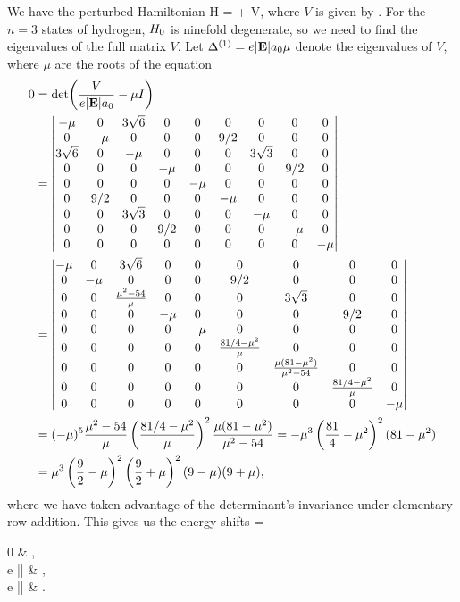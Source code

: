 \begin{solution}
	We have the perturbed Hamiltonian
	\beq
		H = \Ho + \lambda V,
	\eeq
	where $V$ is given by .  For the $n = 3$ states of hydrogen, $H_0$ is ninefold degenerate, so we need to find the eigenvalues of the full matrix $V$.  Let $\Delta^{(1)} = e |\mathbf{E}| a_0 \mu$ denote the eigenvalues of $V$, where $\mu$ are the roots of the equation
	\begin{align*}
		0 &= \det(\frac{V}{e |\vE| \ao} - \mu I) \\
		&= \vmqty{-\mu & 0 & 3 \sqrt{6} & 0 & 0 & 0 & 0 & 0 & 0 \\
			0 & -\mu & 0 & 0 & 0 & 9/2 & 0 & 0 & 0 \\
			3 \sqrt{6} & 0 & -\mu & 0 & 0 & 0 & 3 \sqrt{3} & 0 & 0 \\
			0 & 0 & 0 & -\mu & 0 & 0 & 0 & 9/2 & 0 \\
			0 & 0 & 0 & 0 & -\mu & 0 & 0 & 0 & 0 \\
			0 & 9/2 & 0 & 0 & 0 & -\mu & 0 & 0 & 0 \\
			0 & 0 & 3 \sqrt{3} & 0 & 0 & 0 & -\mu & 0 & 0 \\
			0 & 0 & 0 & 9/2 & 0 & 0 & 0 & -\mu & 0 \\
			0 & 0 & 0 & 0 & 0 & 0 & 0 & 0 & -\mu} \\
		&= \vmqty{-\mu & 0 & 3 \sqrt{6} & 0 & 0 & 0 & 0 & 0 & 0 \\
			0 & -\mu & 0 & 0 & 0 & 9/2 & 0 & 0 & 0 \\
			0 & 0 & \frac{\mu^2 - 54}{\mu} & 0 & 0 & 0 & 3 \sqrt{3} & 0 & 0 \\
			0 & 0 & 0 & -\mu & 0 & 0 & 0 & 9/2 & 0 \\
			0 & 0 & 0 & 0 & -\mu & 0 & 0 & 0 & 0 \\
			0 & 0 & 0 & 0 & 0 & \frac{81/4 - \mu^2}{\mu} & 0 & 0 & 0 \\
			0 & 0 & 0 & 0 & 0 & 0 & \frac{\mu (81 - \mu^2)}{\mu^2 - 54} & 0 & 0 \\
			0 & 0 & 0 & 0 & 0 & 0 & 0 & \frac{81/4 - \mu^2}{\mu} & 0 \\
			0 & 0 & 0 & 0 & 0 & 0 & 0 & 0 & -\mu} \\
			&= (-\mu)^5 \frac{\mu^2 - 54}{\mu} \left( \frac{81/4 - \mu^2}{\mu} \right)^2 \frac{\mu (81 - \mu^2)}{\mu^2 - 54}
			= -\mu^3 \left( \frac{81}{4} - \mu^2 \right)^2 (81 - \mu^2) \\
			&= \mu^3 \left( \frac{9}{2} - \mu \right)^2 \left( \frac{9}{2} + \mu \right)^2 (9 - \mu) (9 + \mu),
	\end{align*}
	where we have taken advantage of the determinant's invariance under elementary row addition.  This gives us the energy shifts
	\beq
		\Del = \begin{cases}
			0 & , \\
			\pm{} e |\vE| \ao & , \\
			 e |\vE| \ao & .
		\end{cases}
	\eeq
\end{solution}